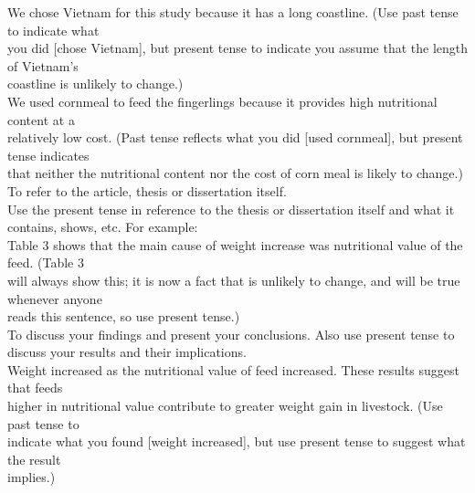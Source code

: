        We chose Vietnam for this study because it has a long coastline. (Use past tense to indicate what\\
       you did [chose Vietnam], but present tense to indicate you assume that the length of Vietnam's\\
       coastline is unlikely to change.)\\

       We used cornmeal to feed the fingerlings because it provides high nutritional content at a\\
       relatively low cost. (Past tense reflects what you did [used cornmeal], but present tense indicates\\
       that neither the nutritional content nor the cost of corn meal is likely to change.)\\

To refer to the article, thesis or dissertation itself.\\

Use the present tense in reference to the thesis or dissertation itself and what it contains, shows, etc. For example:\\

       Table 3 shows that the main cause of weight increase was nutritional value of the feed. (Table 3\\
       will always show this; it is now a fact that is unlikely to change, and will be true whenever anyone\\
       reads this sentence, so use present tense.)\\

To discuss your findings and present your conclusions. Also use present tense to discuss your results and their implications.\\

       Weight increased as the nutritional value of feed increased. These results suggest that feeds\\
       higher in nutritional value contribute to greater weight gain in livestock. (Use past tense to\\
       indicate what you found [weight increased], but use present tense to suggest what the result\\
       implies.)\\

